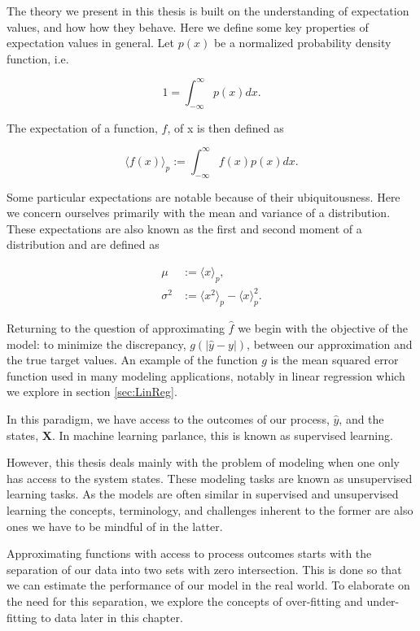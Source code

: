 The theory we present in this thesis is built on the understanding of expectation values, and how how they behave.  Here we define some key properties of expectation values in general. Let $p(x)$ be a normalized probability density function, i.e.

\begin{equation}
1 = \int_{-\infty}^\infty p(x) dx.
\end{equation}

\noindent The expectation of a function, $f$, of x is then defined as 

\begin{equation}\label{eq:expect}
\langle f(x) \rangle_p :=\int_{-\infty}^\infty f(x) p(x) dx.
\end{equation}

\noindent Some particular expectations are notable because of their ubiquitousness. Here we concern ourselves primarily with the mean and variance of a distribution. These expectations are also known as the first and second moment of a distribution and are defined as

\begin{align}
\mu &:= \langle x \rangle_p, \\
\sigma^2 &:= \langle x^2 \rangle_p  - \langle x\rangle_p^2.
\end{align}

\noindent Returning to the question of approximating $\hat{f}$ we begin with the objective of the model: to minimize the discrepancy, $g(|\hat{y} - y|)$, between our approximation and the true target values. An example of the function $g$ is the mean squared error function used in many modeling applications, notably in linear regression which we explore in section \ref{sec:LinReg}.

In this paradigm, we have access to the outcomes of our process, $\hat{y}$, and the states, $\mathbf{X}$. In machine learning parlance, this is known as supervised learning. 

However, this thesis deals mainly with the problem of modeling when one only has access to the system states. These modeling tasks are known as unsupervised learning tasks. As the models are often similar in supervised and unsupervised learning the concepts, terminology, and challenges inherent to the former are also ones we have to be mindful of in the latter.

Approximating functions with access to process outcomes starts with the separation of our data into two sets with zero intersection. This is done so that we can estimate the performance of our model in the real world. To elaborate on the need for this separation, we explore the concepts of over-fitting and under-fitting to data later in this chapter.